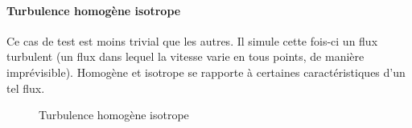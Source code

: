 \paragraph{Turbulence homogène isotrope}Ce cas de test est moins trivial que les autres. Il simule cette fois-ci un flux turbulent (un flux dans lequel la vitesse varie en tous points, de manière imprévisible). Homogène et isotrope se rapporte à certaines caractéristiques d'un tel flux. 

\begin{figure}[ht]
  \centering
  \caption{\label{fig:turbiso}Turbulence homogène isotrope}
\end{figure}



